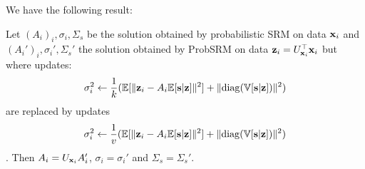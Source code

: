 \documentclass{article}
\begin{document}
We have the following result:
\begin{proposition}
  Let $(A_i)_i, \sigma_i, \Sigma_s$ be the solution obtained by probabilistic SRM on data
  $\mathbf{x}_i$ and $(A_i')_i, \sigma_i', \Sigma_s'$ the solution obtained by ProbSRM on
  data $\mathbf{z}_i = U_{\mathbf{x}_i}^{\top} \mathbf{x}_i$ but where updates:
  \begin{align}
    \sigma_i^2 \leftarrow \frac1{k} (\mathbb{E}[\| \mathbf{z}_i - A_i \mathbb{E}[\mathbf{s}|\mathbf{z}]\|^2] + \| {\rm diag}(\mathbb{V}[\mathbf{s} | \mathbf{z}]) \|^2)
  \end{align}
  are replaced by updates
  \begin{align}
    \sigma_i^2 \leftarrow \frac1{v} (\mathbb{E}[\| \mathbf{z}_i - A_i \mathbb{E}[\mathbf{s}|\mathbf{z}]\|^2] + \| {\rm diag}(\mathbb{V}[\mathbf{s} | \mathbf{z}]) \|^2)
  \end{align}
  .
  Then $A_i = U_{\mathbf{x}_i}A_i'$, $\sigma_i =
  \sigma_i'$ and $\Sigma_s = \Sigma_s'$.
  
  \label{prop:optimalprobsrm}
\end{proposition}
\end{document}

